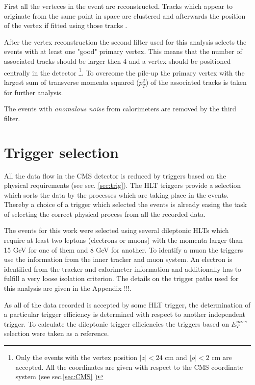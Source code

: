 First all the verteces in the event are reconstructed.
Tracks which appear to originate from the same point in space are clustered and afterwards the position of the vertex if fitted using those tracks \cite{TrackPerf}.

After the vertex reconstruction the second filter used for this analysis selects the events with at least one "good" primary vertex.
This means that the number of associated tracks should be larger then 4 and a vertex should be positioned centrally in the detector
\footnote{Only the events with the vertex position $|z| < \textrm{24 cm}$ and $|\rho| < \textrm{2 cm}$ are accepted. All the coordinates
are given with respect to the CMS coordinate system (see sec.\ref{sec:CMS} )}. To overcome the pile-up the primary vertex with the 
largest sum of transverse momenta squared ($p_{T}^{2}$) of the associated tracks is taken for further analysis.

The events with \textit{anomalous noise} from calorimeters are removed by the third filter.


\section{Trigger selection}

All the data flow in the CMS detector is reduced by triggers based on the physical requirements (see sec. \ref{sec:trig}).
The HLT triggers provide a selection which sorts the data by the processes which are taking place in the events. Thereby
a choice of a trigger which selected the events is already easing the task of selecting the correct physical process from
all the recorded data.

The events for this work were selected using several dileptonic HLTs which require at least two leptons (electrons or muons)
with the momenta larger than 15 GeV for one of them and 8 GeV for another. To identify a muon the triggers use the information
from the inner tracker and muon system. An electron is identified from the tracker and calorimeter information and additionally
has to fulfill a very loose isolation criterion. The details on the trigger paths used for this analysis are given in the
Appendix !!!.

As all of the data recorded is accepted by some HLT trigger, the determination of a particular trigger efficiency is determined with 
respect to another independent trigger. To calculate the dileptonic trigger efficiencies the triggers based on $E_{T}^{miss}$ selection
were taken as a reference.


